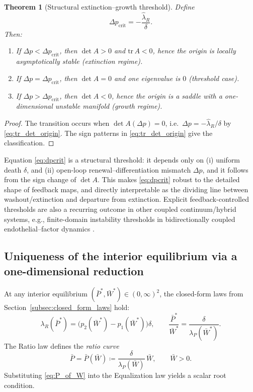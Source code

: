 \documentclass[pdflatex,sn-mathphys-ay]{sn-jnl}
\theoremstyle{thmstyleone}
\newtheorem{theorem}{Theorem}[section]
\theoremstyle{definition}
\theoremstyle{remark}
\begin{document}
\begin{theorem}[Structural extinction--growth threshold]
\label{thm:extinction_growth}
Define
\begin{equation}\label{eq:dpcrit}
\Delta p_{\mathrm{crit}}=-\frac{\hat\lambda_R}{\delta}.
\end{equation}
Then:
\begin{enumerate}[label=(\roman*), leftmargin=2.2em]
\item If $\Delta p<\Delta p_{\mathrm{crit}}$, then $\det A>0$ and $\mathrm{tr}\,A<0$, hence the origin is locally asymptotically stable (extinction regime).
\item If $\Delta p=\Delta p_{\mathrm{crit}}$, then $\det A=0$ and one eigenvalue is $0$ (threshold case).
\item If $\Delta p>\Delta p_{\mathrm{crit}}$, then $\det A<0$, hence the origin is a saddle with a one-dimensional unstable manifold (growth regime).
\end{enumerate}
\end{theorem}

\begin{proof}
The transition occurs when $\det A(\Delta p)=0$, i.e.\ $\Delta p=-\hat\lambda_R/\delta$ by
\eqref{eq:tr_det_origin}. The sign patterns in \eqref{eq:tr_det_origin} give the classification.
\end{proof}

Equation \eqref{eq:dpcrit} is a structural threshold: it depends only on (i) uniform death
$\delta$, and (ii) open-loop renewal--differentiation mismatch $\Delta p$, and it follows from the
sign change of $\det A$. This makes \eqref{eq:dpcrit} robust to the detailed shape of feedback maps,
and directly interpretable as the dividing line between washout/extinction and departure from
extinction.
Explicit feedback-controlled thresholds are also a recurring outcome in other coupled continuum/hybrid systems, e.g., finite-domain instability thresholds in bidirectionally coupled endothelial–factor dynamics \citep{liu_bidirectional_2025}.

\subsection{Uniqueness of the interior equilibrium via a one-dimensional reduction}
\label{subsec:uniqueness_1d}
At any interior equilibrium $(\bar P^*,\bar W^*)\in(0,\infty)^2$, the closed-form laws from
Section~\ref{subsec:closed_form_laws} hold:
\begin{equation}\label{eq:equil_laws_recall}
\lambda_R(\bar P^*)=\big(p_2(\bar W^*)-p_1(\bar W^*)\big)\delta,\qquad
\frac{\bar P^*}{\bar W^*}=\frac{\delta}{\lambda_P(\bar W^*)}.
\end{equation}
The Ratio law defines the \emph{ratio curve}
\begin{equation}\label{eq:P_of_W}
\bar P=\bar P(\bar W)\coloneqq \frac{\delta}{\lambda_P(\bar W)}\,\bar W,\qquad \bar W>0.
\end{equation}
Substituting \eqref{eq:P_of_W} into the Equalization law yields a scalar root condition.
\end{document}

